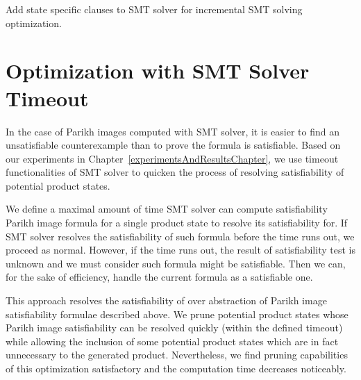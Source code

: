 \begin{algorithm}
\caption{Add state specific clauses to SMT solver for incremental SMT solving optimization.}\label{productConstructionParikhImageAlgorithmAddPersistentClauses}

\DontPrintSemicolon
{}
\end{algorithm}\DecMargin{1em}


\section{Optimization with SMT Solver Timeout}

In the case of Parikh images computed with SMT solver, it is easier to find an unsatisfiable counterexample than to prove the formula is satisfiable. Based on our experiments in Chapter~\ref{experimentsAndResultsChapter}, we use timeout functionalities of SMT solver to quicken the process of resolving satisfiability of potential product states.

We define a maximal amount of time SMT solver can compute satisfiability Parikh image formula for a single product state to resolve its satisfiability for. If SMT solver resolves the satisfiability of such formula before the time runs out, we proceed as normal. However, if the time runs out, the result of satisfiability test is unknown and we must consider such formula might be satisfiable. Then we can, for the sake of efficiency, handle the current formula as a satisfiable one.

This approach resolves the satisfiability of over abstraction of Parikh image satisfiability formulae described above. We prune potential product states whose Parikh image satisfiability can be resolved quickly (within the defined timeout) while allowing the inclusion of some potential product states which are in fact unnecessary to the generated product. Nevertheless, we find pruning capabilities of this optimization satisfactory and the computation time decreases noticeably.

